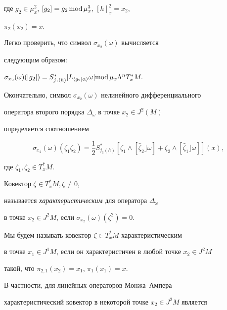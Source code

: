где $g_2\in \mu_x^2$, $[g_2]=g_2\operatorname{mod} {\mu_x^3}$, $[h]_x^2=x_2,$


$\pi_2(x_2)=x$.


Легко проверить, что символ $\sigma_{x_2}(\omega )$ вычисляется


следующим образом:


$\sigma_{x_2}(\omega)([g_2])=


S_{j_1(h)}^*[L_{\langle g_2\mid\alpha\rangle}\omega]


{\Mod {\mu_x}}\Lambda^nT_x^{*}M.$


Окончательно, символ $\sigma_{x_2}(\omega )$ нелинейного дифференциального 


оператора второго порядка $\Delta_\omega $ в точке $x_2\in J^2(M)$ 


определяется соотношением


\begin{equation}


\sigma_{x_2}(\omega)(\zeta_1\zeta_2)=\frac 12S_{j_1(h)}^*[\zeta_1\wedge


[\widehat{\zeta}_2\rfloor \omega ]+\zeta_2\wedge [\widehat{\zeta }


_1\rfloor \omega ]](x), \label{symbol}


\end{equation}


где $\zeta_1, \zeta_2\in T_x^{*}M$.





\begin{defn}


Ковектор $\zeta \in T_x^{*}M,\zeta \neq 0$,


называется {\em характеристическим} для оператора $\Delta_\omega$ 


в точке $x_2\in J^2M$, если $\sigma_{x_2}(\omega )(\zeta^2)=0$.


Мы будем называть ковектор $\zeta \in T_x^{*}M$ характеристическим


в точке $x_1\in J^1M$, если он характеристичен в любой точке $x_2\in J^2M$ 


такой, что $\pi_{2,1}(x_2)=x_1$, $\pi_1(x_1)=x$.


\end{defn}





В частности, для линейных операторов Монжа--Ампера


характеристический ковектор в некоторой точке $x_2\in J^2M$ является



